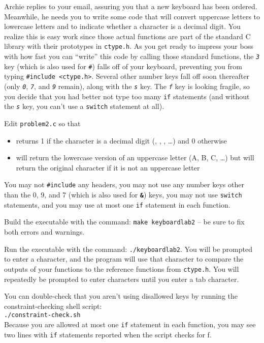 Archie replies to your email, assuring you that a new keyboard has been ordered.
Meanwhile, he needs you to write some code that will convert uppercase letters to lowercase letters and to indicate whether a character is a decimal digit.
You realize this is easy work since those actual functions are part of the standard C library with their prototypes in \texttt{ctype.h}.
As you get ready to impress your boss with how fast you can ``write'' this code by calling those standard functions, the \textit{\texttt{3}} key (which is also used for \textit{\texttt{\#}}) falls off of your keyboard, preventing you from typing \lstinline{#include <ctype.h>}.
Several other number keys fall off soon thereafter (only \textit{\texttt{0}}, \textit{\texttt{7}}, and \textit{\texttt{9}} remain), along with the \textit{\texttt{s}} key.
The \textit{\texttt{f}} key is looking fragile, so you decide that you had better not type too many \lstinline{if} statements (and without the \textit{\texttt{s}} key, you can't use a \lstinline{switch} statement at all).

Edit \texttt{problem2.c} so that
\begin{itemize}
    \item {} returns 1 if the character is a decimal digit (\textquotesingle, \textquotesingle, \textquotesingle, \dots) and 0 otherwise
    \item {} will return the lowercase version of an uppercase letter (\textquotesingle A\textquotesingle, \textquotesingle B\textquotesingle, \textquotesingle C\textquotesingle, \dots) but will return the original character if it is not an uppercase letter
\end{itemize}
You may not \lstinline{#include} any headers, you may not use any number keys other than the 0, 9, and 7 (which is also used for \textbf{\texttt{\&}}) keys, you may not use \lstinline{switch} statements, and you may use at most one \lstinline{if} statement in each function.

Build the executable with the command: \texttt{make keyboardlab2} -- be sure to fix both errors and warnings.

Run the executable with the command: \texttt{./keyboardlab2}.
You will be prompted to enter a character, and the program will use that character to compare the outputs of your functions to the reference functions from \texttt{ctype.h}.
You will repeatedly be prompted to enter characters until you enter a tab character.

You can double-check that you aren't using disallowed keys by running the constraint-checking shell script: \\
\texttt{./constraint-check.sh} \\
Because you are allowed at most one \lstinline{if} statement in each function, you may see two lines with \lstinline{if} statements reported when the script checks for \textquotesingle f\textquotesingle.
